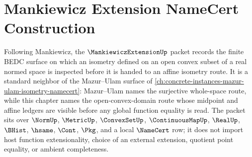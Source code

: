 \chapter{Mankiewicz Extension NameCert Construction}
\label{ch:concrete-instances-mankiewicz-extension-namecert}

Following Mankiewicz, the $\MankiewiczExtensionUp$ packet records the finite BEDC surface on which an isometry defined on an open convex subset of a real normed space is inspected before it is handed to an affine isometry route. It is a standard neighbor of the Mazur--Ulam surface of \autoref{ch:concrete-instances-mazur-ulam-isometry-namecert}: Mazur--Ulam names the surjective whole-space route, while this chapter names the open-convex-domain route whose midpoint and affine ledgers are visible before any global function equality is read. The packet sits over $\NormUp$, $\MetricUp$, $\ConvexSetUp$, $\ContinuousMapUp$, $\RealUp$, $\BHist$, $\hsame$, $\Cont$, $\Pkg$, and a local $\NameCert$ row; it does not import host function extensionality, choice of an external extension, quotient point equality, or ambient completeness.

